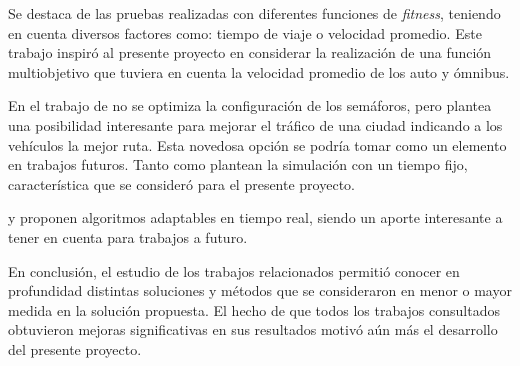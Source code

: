 Se destaca de \citet{Sanchez2010} las pruebas realizadas con diferentes funciones de \emph{fitness}, teniendo en cuenta diversos factores como: tiempo de viaje o velocidad promedio. Este trabajo inspiró al presente proyecto en considerar la realización de una función multiobjetivo que tuviera en cuenta la velocidad promedio de los auto y ómnibus.

En el trabajo de \citet{Stolfi2012} no se optimiza la configuración de los semáforos, pero plantea una posibilidad interesante para mejorar el tráfico de una ciudad indicando a los vehículos la mejor ruta. Esta novedosa opción se podría tomar como un elemento en trabajos futuros. Tanto \citet{Teo2010} como \citet{Stolfi2012} plantean la simulación con un tiempo fijo, característica que se consideró para el presente proyecto.

\citet{Montana1996} y \citet{Vogel2000}  proponen algoritmos adaptables en tiempo real, siendo un aporte interesante a tener en cuenta para trabajos a futuro.

En conclusión, el estudio de los trabajos relacionados permitió conocer en profundidad distintas soluciones y métodos que se consideraron en menor o mayor medida en la solución propuesta. El hecho de que todos los trabajos consultados obtuvieron mejoras significativas en sus resultados motivó aún más el desarrollo del presente proyecto.





